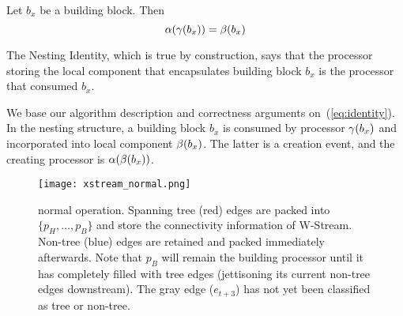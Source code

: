 \begin{definition}
Let $b_x$ be a building block. Then
\begin{equation}
\alpha(\gamma(b_x))  =  \beta(b_x) \label{eq:identity}
\end{equation}
\end{definition}
\noindent
The \XStream Nesting Identity, which is true by construction, says that the
processor storing the local component that encapsulates building
block $b_x$ is the processor that consumed $b_x$.

We base our algorithm description and correctness arguments
on~(\ref{eq:identity}).  In the \XStream nesting structure, a building block $b_x$
is consumed by processor $\gamma(b_x)$ and incorporated into local
component $\beta(b_x)$.  The latter is a creation event, and the
creating processor is $\alpha(\beta(b_x))$.

\begin{figure*}[thb]
\begin{center}
\texttt{[image: xstream\_normal.png]}
\end{center}
\caption{\label{fig:xstream-normal} \XStream normal operation.  Spanning 
tree (red) edges are packed into $\{p_H,\ldots, p_B\}$ and store the 
connectivity information of W-Stream.  Non-tree (blue) edges are retained and
packed immediately afterwards. Note that $p_B$ will remain the building
processor until it has completely filled with tree edges (jettisoning its
current non-tree edges downstream). The gray edge ($e_{t+3}$) has not yet
been classified as tree or non-tree.  }
\end{figure*}

